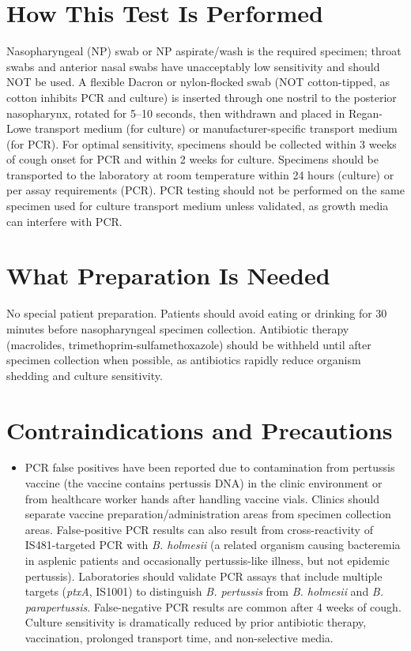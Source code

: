 \section*{How This Test Is Performed}
Nasopharyngeal (NP) swab or NP aspirate/wash is the required specimen; throat swabs and anterior nasal swabs have unacceptably low sensitivity and should NOT be used. A flexible Dacron or nylon-flocked swab (NOT cotton-tipped, as cotton inhibits PCR and culture) is inserted through one nostril to the posterior nasopharynx, rotated for 5--10 seconds, then withdrawn and placed in Regan-Lowe transport medium (for culture) or manufacturer-specific transport medium (for PCR). For optimal sensitivity, specimens should be collected within 3 weeks of cough onset for PCR and within 2 weeks for culture. Specimens should be transported to the laboratory at room temperature within 24 hours (culture) or per assay requirements (PCR). PCR testing should not be performed on the same specimen used for culture transport medium unless validated, as growth media can interfere with PCR.

\section*{What Preparation Is Needed}
No special patient preparation. Patients should avoid eating or drinking for 30 minutes before nasopharyngeal specimen collection. Antibiotic therapy (macrolides, trimethoprim-sulfamethoxazole) should be withheld until after specimen collection when possible, as antibiotics rapidly reduce organism shedding and culture sensitivity.

\section*{Contraindications and Precautions}
\begin{itemize}
  \item PCR false positives have been reported due to contamination from pertussis vaccine (the vaccine contains pertussis DNA) in the clinic environment or from healthcare worker hands after handling vaccine vials. Clinics should separate vaccine preparation/administration areas from specimen collection areas. False-positive PCR results can also result from cross-reactivity of IS481-targeted PCR with \textit{B. holmesii} (a related organism causing bacteremia in asplenic patients and occasionally pertussis-like illness, but not epidemic pertussis). Laboratories should validate PCR assays that include multiple targets (\textit{ptxA}, IS1001) to distinguish \textit{B. pertussis} from \textit{B. holmesii} and \textit{B. parapertussis}. False-negative PCR results are common after 4 weeks of cough. Culture sensitivity is dramatically reduced by prior antibiotic therapy, vaccination, prolonged transport time, and non-selective media.
\end{itemize}
